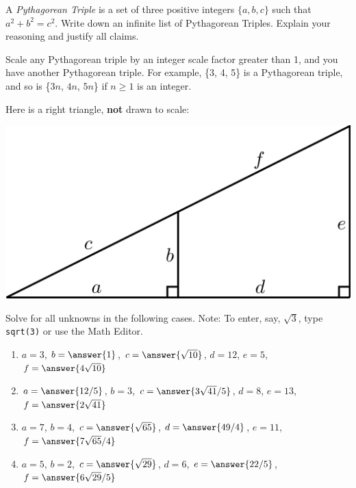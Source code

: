 \documentclass[nooutcomes]{ximera}
\begin{document}
\begin{question}
A \textit{Pythagorean Triple} is a set
  of three positive integers $\{a,b,c\}$ such that $a^2 + b^2 =
  c^2$. Write down an infinite list of Pythagorean Triples. Explain
  your reasoning and justify all claims.
\begin{freeResponse}
\end{freeResponse}
\begin{hint}
Scale any Pythagorean triple by an integer scale factor greater than 1, and you have another Pythagorean triple.  For example, \{3, 4, 5\} is a Pythagorean triple, and so is \{$3n$, $4n$, $5n$\} if $n \ge 1$ is an integer.  
\end{hint}
\end{question}

\begin{question}
Here is a right triangle, \textbf{not} drawn to scale:
\begin{image}
\includegraphics{origamiSimQ.png}
\end{image}
Solve for all unknowns in the following cases.  Note:  To enter, say, $\sqrt{3}$, type \texttt{sqrt(3)} or use the Math Editor. 
\begin{enumerate}
\item $a = 3$, $b = \answer{1}$, $c = \answer{\sqrt{10}}$, $d = 12$, $e = 5$, $f = \answer{4 \sqrt{10}}$
\item $a = \answer{12/5}$, $b = 3$, $c = \answer{3\sqrt{41}/5}$, $d =8$, $e = 13$, $f = \answer{2\sqrt{41}}$
\item $a = 7$, $b = 4$, $c = \answer{\sqrt{65}}$, $d =\answer{49/4}$, $e = 11$, $f = \answer{7\sqrt{65}/4}$
\item $a = 5$, $b = 2$, $c = \answer{\sqrt{29}}$, $d =6$, $e = \answer{22/5}$, $f = \answer{6\sqrt{29}/5}$
\end{enumerate}
\end{question}
\end{document}
